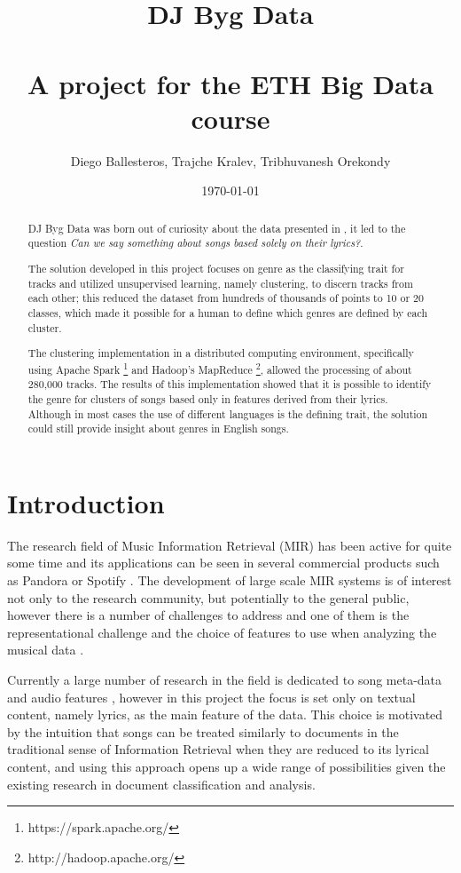 \documentclass[10pt,a4paper, twocolumn]{article}
\author{Diego Ballesteros, Trajche Kralev, Tribhuvanesh Orekondy}
\title{DJ Byg Data \\ \hspace{10pt} \\ \small{A project for the ETH Big Data course}}
\date{\today}
\begin{document}
  \maketitle
  
  \begin{abstract}
  	DJ Byg Data was born out of curiosity about the data presented in
  	\cite{RapperWords}, it led to the question \textit{Can we say something about songs
  	based solely on their lyrics?}.
  	
  	The solution developed in this project focuses on genre
  	as the classifying trait for tracks and utilized unsupervised learning, namely
  	clustering, to discern tracks from each other; this reduced the dataset
  	from hundreds of thousands of points to 10 or 20 classes, which made it possible for
  	a human to define which genres are defined by each cluster. 
  	
  	The clustering implementation in a distributed computing environment,
  	specifically using Apache Spark
  	\footnote{https://spark.apache.org/} and Hadoop's MapReduce
  	\footnote{http://hadoop.apache.org/}, allowed the processing of about 280,000
  	tracks. The results of this implementation showed
  	that it is possible to identify the genre for clusters of songs based only
  	in features derived from their lyrics. Although in most cases the use of different
  	languages is the defining trait, the solution could still provide insight about
  	genres in English songs.
  \end{abstract}

  \section{Introduction}
	The research field of Music Information Retrieval (MIR) has been active for quite some
	time \cite{nameThatTune:1993} and its applications can be seen in several commercial
	products such as Pandora or Spotify \cite{recommendation:2010}. The development of
	large scale MIR systems is of interest not only to the research community, but
	potentially to the general public, however there is a number of challenges
	to address and one of them is the representational challenge
	and the choice of features to use when analyzing the musical data
	\cite{ARIS:ARIS1440370108}. 
	
	Currently a large number of research in the field is
	dedicated to song meta-data and audio features \cite{McFee:2012:MSD:2187980.2188222},
	however in this project the focus is set only on textual content, namely lyrics, as
	the main feature of the data. This choice is motivated by the intuition that
	songs can be treated similarly to documents in the traditional sense of
	Information Retrieval when they are reduced to its lyrical content, and using this
	approach opens up a wide range of possibilities given the existing research
	in document classification and analysis.
	
\end{document}
